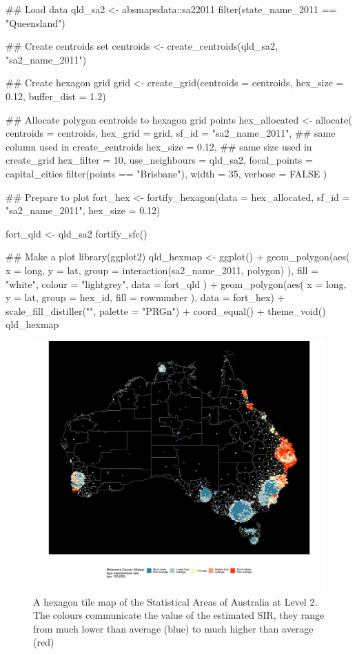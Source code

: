 \begin{Schunk}
\begin{Sinput}
## Load data
qld_sa2 <- absmapsdata::sa22011 %
  filter(state_name_2011 == "Queensland")

## Create centroids set
centroids <- create_centroids(qld_sa2, "sa2_name_2011")

## Create hexagon grid
grid <- create_grid(centroids = centroids,
                    hex_size = 0.12,
                    buffer_dist = 1.2)

## Allocate polygon centroids to hexagon grid points
hex_allocated <- allocate(
  centroids = centroids,
  hex_grid = grid,
  sf_id = "sa2_name_2011",
  ## same column used in create_centroids
  hex_size = 0.12,
  ## same size used in create_grid
  hex_filter = 10,
  use_neighbours = qld_sa2,
  focal_points = capital_cities %
    filter(points == "Brisbane"),
  width = 35,
  verbose = FALSE
)

## Prepare to plot
fort_hex <- fortify_hexagon(data = hex_allocated,
                            sf_id = "sa2_name_2011",
                            hex_size = 0.12)

fort_qld <- qld_sa2 %
  fortify_sfc()

## Make a plot
library(ggplot2)
qld_hexmap <- ggplot() +
  geom_polygon(aes(
      x = long,
      y = lat,
      group = interaction(sa2_name_2011, polygon)
    ),
    fill = "white",
    colour = "lightgrey",
    data = fort_qld
  ) +
  geom_polygon(aes(
    x = long,
    y = lat,
    group = hex_id,
    fill = rownumber
  ),
  data = fort_hex) +
  scale_fill_distiller("", palette = "PRGn") +
  coord_equal() + theme_void()
qld_hexmap
\end{Sinput}
\end{Schunk}

\begin{figure}[h]
\centering
\includegraphics[width=14cm]{figs/aus_gghexmap.pdf}
\caption{\label{fig:melanoma-hex}A hexagon tile map of the Statistical Areas of Australia at Level 2. The colours communicate the value of the estimated SIR, they range from much lower than average (blue) to much higher than average (red)}
\end{figure}

